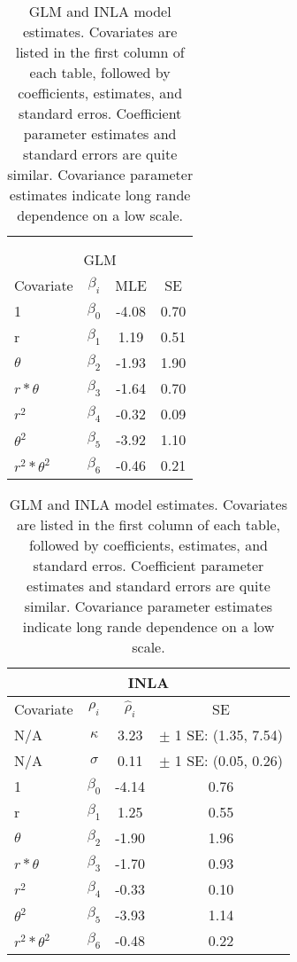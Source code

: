 \begin{table}
\begin{tabular}{| l | c | c | c |}
\hline
\multicolumn{4}{|c|}{} \\
\multicolumn{4}{|c|}{} \\
\multicolumn{4}{|c|}{GLM} \\
\hline
Covariate         & $\beta_{i}$ & MLE   & SE   \\ \hline
1                 & $\beta_{0}$ & -4.08 & 0.70 \\ \hline
r                 & $\beta_{1}$ &  1.19 & 0.51 \\ \hline
$\theta$          & $\beta_{2}$ & -1.93 & 1.90 \\ \hline
$r*\theta$        & $\beta_{3}$ & -1.64 & 0.70 \\ \hline
$r^{2}$           & $\beta_{4}$ & -0.32 & 0.09 \\ \hline
$\theta^{2}$      & $\beta_{5}$ & -3.92 & 1.10 \\ \hline
$r^{2}*\theta^{2}$& $\beta_{6}$ & -0.46 & 0.21 \\ \hline
\end{tabular}
\quad
\begin{tabular}{| l | c | c | c |}
\hline
\multicolumn{4}{|c|}{INLA} \\
\hline
Covariate         & $\rho _{i}$ & $\hat{\rho}_{i}$ & SE \\ \hline
N/A               & $\kappa$    &  3.23 & $\pm$ 1 SE: (1.35, 7.54) \\ \hline
N/A               & $\sigma$    &  0.11 & $\pm$ 1 SE: (0.05, 0.26) \\ \hline
1                 & $\beta_{0}$ & -4.14 & 0.76 \\ \hline
r                 & $\beta_{1}$ &  1.25 & 0.55 \\ \hline
$\theta$          & $\beta_{2}$ & -1.90 & 1.96 \\ \hline
$r*\theta$        & $\beta_{3}$ & -1.70 & 0.93 \\ \hline
$r^{2}$           & $\beta_{4}$ & -0.33 & 0.10 \\ \hline
$\theta^{2}$      & $\beta_{5}$ & -3.93 & 1.14 \\ \hline
$r^{2}*\theta^{2}$& $\beta_{6}$ & -0.48 & 0.22 \\ \hline 
\end{tabular} \\
\caption{GLM and INLA model estimates. Covariates are listed in the first column of each table, followed by coefficients, estimates, and standard erros. Coefficient parameter estimates and standard errors are quite similar. Covariance parameter estimates indicate long rande dependence on a low scale.}
\end{table}

